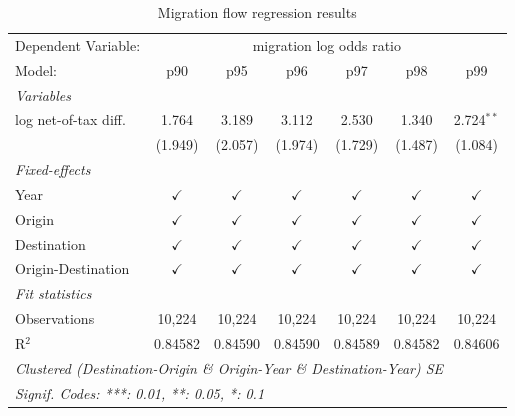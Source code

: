 \documentclass[11pt]{article}
\begin{document}
\begin{table}[H]
	\centering
	\small
	\begin{threeparttable}[b]
		\begin{tabular}{lcccccc}
			\toprule
			Dependent Variable: & \multicolumn{6}{c}{migration log odds ratio}\\
			Model:             & p90           & p95           & p96           & p97           & p98           &p99 \\  
			\midrule
			\emph{Variables}\\
			log net-of-tax diff.    & 1.764         & 3.189         & 3.112         & 2.530         & 1.340         & 2.724$^{**}$\\   
			& (1.949)       & (2.057)       & (1.974)       & (1.729)       & (1.487)       & (1.084)\\   
			\midrule
			\emph{Fixed-effects}\\
			Year               & $\checkmark$  & $\checkmark$  & $\checkmark$  & $\checkmark$  & $\checkmark$  & $\checkmark$\\   
			Origin             & $\checkmark$  & $\checkmark$  & $\checkmark$  & $\checkmark$  & $\checkmark$  & $\checkmark$\\   
			Destination        & $\checkmark$  & $\checkmark$  & $\checkmark$  & $\checkmark$  & $\checkmark$  & $\checkmark$\\   
			Origin-Destination & $\checkmark$  & $\checkmark$  & $\checkmark$  & $\checkmark$  & $\checkmark$  & $\checkmark$\\   
			\midrule
			\emph{Fit statistics}\\
			Observations       & 10,224        & 10,224        & 10,224        & 10,224        & 10,224        & 10,224\\  
			R$^2$              & 0.84582       & 0.84590       & 0.84590       & 0.84589       & 0.84582       & 0.84606\\  
			\midrule
			\multicolumn{7}{l}{\emph{Clustered (Destination-Origin \& Origin-Year \& Destination-Year) SE}}\\
			\multicolumn{7}{l}{\emph{Signif. Codes: ***: 0.01, **: 0.05, *: 0.1}}\\
		\end{tabular}
	\end{threeparttable}
	\caption{Migration flow regression results}
	\label{table:migflow}
\end{table}
\end{document}
